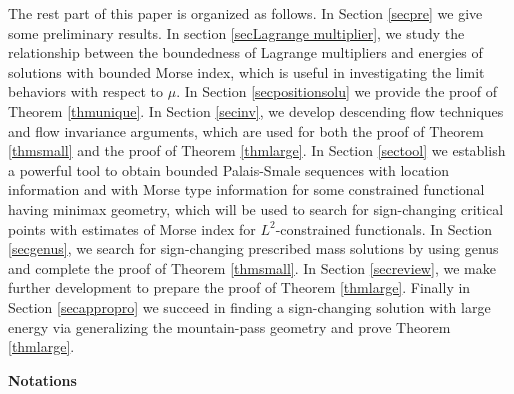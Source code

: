 \documentclass[10pt,a4paper]{article}
\theoremstyle{definition} \theoremstyle{remark}
\numberwithin{equation}{section}
\begin{document}
\vskip0.3in

The rest part of this paper is organized as follows. In Section \ref{secpre} we give some preliminary results. In section \ref{secLagrange multiplier}, we study the relationship between the boundedness of Lagrange multipliers and energies of solutions with bounded Morse index, which is useful in investigating the limit behaviors with respect to $\mu$. In Section \ref{secpositionsolu} we provide the proof of Theorem \ref{thmunique}. In Section \ref{secinv}, we develop descending flow techniques and flow invariance arguments, which are used for both the proof of Theorem \ref{thmsmall} and the proof of Theorem \ref{thmlarge}. In Section \ref{sectool} we establish a powerful tool to obtain bounded Palais-Smale sequences with location information and with Morse type information for some constrained functional having minimax geometry, which will be used to search for sign-changing critical points with estimates of Morse index for $L^2$-constrained functionals. In Section \ref{secgenus}, we search for sign-changing prescribed mass solutions by using genus and complete the proof of Theorem \ref{thmsmall}. In Section \ref{secreview}, we   make further development to prepare the proof of Theorem \ref{thmlarge}. Finally in Section \ref{secappropro} we succeed in finding a sign-changing solution with large energy via generalizing the mountain-pass geometry and prove Theorem \ref{thmlarge}.

\bigskip

\noindent \textbf{Notations}
\end{document}
